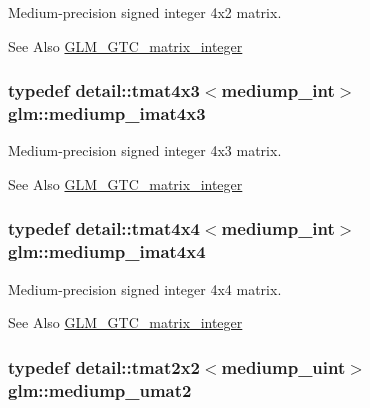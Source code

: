 Medium-\/precision signed integer 4x2 matrix. 

\begin{DoxySeeAlso}{See Also}
\hyperlink{group__gtc__matrix__integer}{G\-L\-M\-\_\-\-G\-T\-C\-\_\-matrix\-\_\-integer} 
\end{DoxySeeAlso}
\hypertarget{group__gtc__matrix__integer_ga689c74a65fc4118f1fe57b6cf953748b}{
\subsubsection[{mediump\-\_\-imat4x3}]{\setlength{\rightskip}{0pt plus 5cm}typedef detail\-::tmat4x3$<$mediump\-\_\-int$>$ {\bf glm\-::mediump\-\_\-imat4x3}}}\label{group__gtc__matrix__integer_ga689c74a65fc4118f1fe57b6cf953748b}


Medium-\/precision signed integer 4x3 matrix. 

\begin{DoxySeeAlso}{See Also}
\hyperlink{group__gtc__matrix__integer}{G\-L\-M\-\_\-\-G\-T\-C\-\_\-matrix\-\_\-integer} 
\end{DoxySeeAlso}
\hypertarget{group__gtc__matrix__integer_gaced73f9aecd6626cdfef5bfb3648b750}{
\subsubsection[{mediump\-\_\-imat4x4}]{\setlength{\rightskip}{0pt plus 5cm}typedef detail\-::tmat4x4$<$mediump\-\_\-int$>$ {\bf glm\-::mediump\-\_\-imat4x4}}}\label{group__gtc__matrix__integer_gaced73f9aecd6626cdfef5bfb3648b750}


Medium-\/precision signed integer 4x4 matrix. 

\begin{DoxySeeAlso}{See Also}
\hyperlink{group__gtc__matrix__integer}{G\-L\-M\-\_\-\-G\-T\-C\-\_\-matrix\-\_\-integer} 
\end{DoxySeeAlso}
\hypertarget{group__gtc__matrix__integer_gaba421c81f872757146b0adb7a954e349}{
\subsubsection[{mediump\-\_\-umat2}]{\setlength{\rightskip}{0pt plus 5cm}typedef detail\-::tmat2x2$<$mediump\-\_\-uint$>$ {\bf glm\-::mediump\-\_\-umat2}}}\label{group__gtc__matrix__integer_gaba421c81f872757146b0adb7a954e349}


